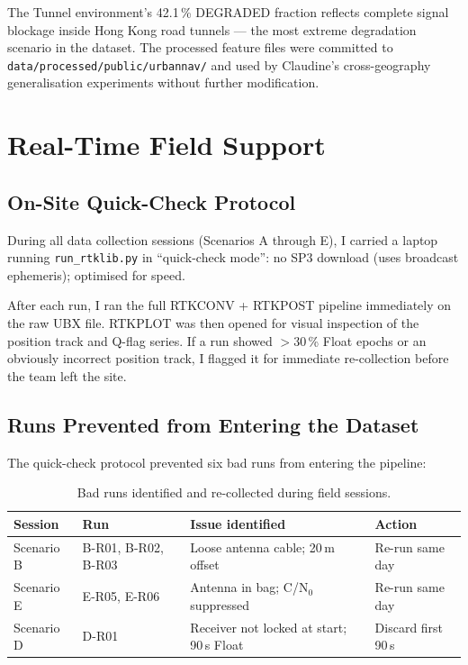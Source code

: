 \documentclass[12pt,a4paper]{article}
\newcommand{\code}[1]{\texttt{#1}}
\begin{document}
The Tunnel environment's 42.1\,\% DEGRADED fraction reflects complete signal blockage
inside Hong Kong road tunnels --- the most extreme degradation scenario in the dataset.
The processed feature files were committed to \code{data/processed/public/urbannav/} and
used by Claudine's cross-geography generalisation experiments without further modification.

\section{Real-Time Field Support}

\subsection{On-Site Quick-Check Protocol}

During all data collection sessions (Scenarios A through E), I carried a laptop
running \code{run\_rtklib.py} in ``quick-check mode'':
no SP3 download (uses broadcast ephemeris); optimised for speed.

After each run, I ran the full RTKCONV + RTKPOST pipeline immediately on the raw UBX
file.
RTKPLOT was then opened for visual inspection of the position track and Q-flag series.
If a run showed $> 30$\,\% Float epochs or an obviously incorrect position track,
I flagged it for immediate re-collection before the team left the site.

\subsection{Runs Prevented from Entering the Dataset}

The quick-check protocol prevented six bad runs from entering the pipeline:

\begin{table}[H]
  \centering
  \caption{Bad runs identified and re-collected during field sessions.}
  \begin{tabular}{llll}
    \toprule
    \textbf{Session} & \textbf{Run} & \textbf{Issue identified} & \textbf{Action} \\
    \midrule
    Scenario B & B-R01, B-R02, B-R03 & Loose antenna cable; 20\,m offset & Re-run same day \\
    Scenario E & E-R05, E-R06        & Antenna in bag; C/N$_0$ suppressed & Re-run same day \\
    Scenario D & D-R01               & Receiver not locked at start; 90\,s Float & Discard first 90\,s \\
    \bottomrule
  \end{tabular}
\end{table}
\end{document}
